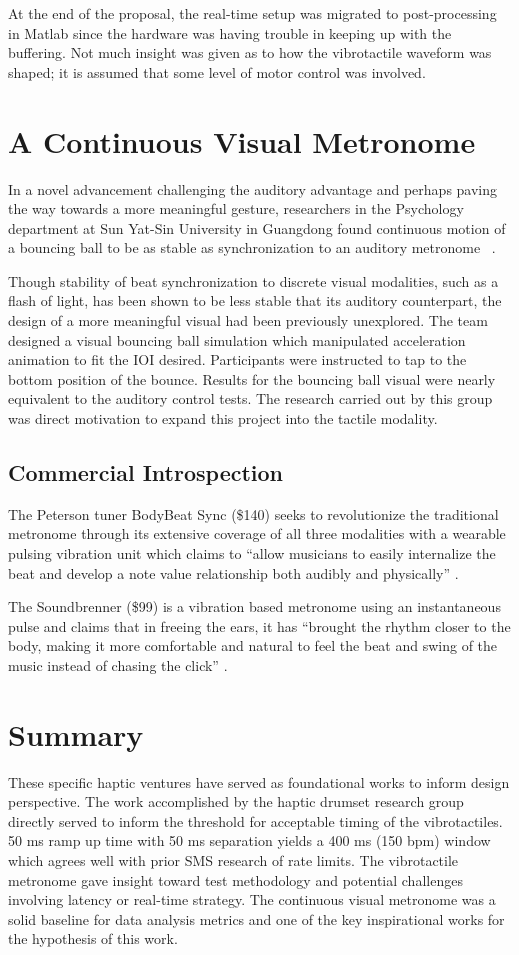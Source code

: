 At the end of the proposal, the real-time setup was migrated to post-processing in Matlab since the hardware was having trouble in keeping up with the buffering. Not much insight was given as to how the vibrotactile waveform was shaped; it is assumed that some level of motor control was involved.

\section{A Continuous Visual Metronome} \label{visualMet}
In a novel advancement challenging the auditory advantage and perhaps paving the way towards a more meaningful gesture, researchers in the Psychology department at Sun Yat-Sin University in Guangdong found continuous motion of a bouncing ball to be as stable as synchronization to an auditory metronome
~\cite{gan2015synchronization}.

Though stability of beat synchronization to discrete visual modalities, such as a flash of light, has been shown to be less stable that its auditory counterpart, the design of a more meaningful visual had been previously unexplored. The team designed a visual bouncing ball simulation which manipulated acceleration animation to fit the IOI desired. Participants were instructed to tap to the bottom position of the bounce. Results for the bouncing ball visual were nearly equivalent to the auditory control tests. The research carried out by this group was direct motivation to expand this project into the tactile modality.

\subsection{Commercial Introspection} \label{commercial}
The Peterson tuner BodyBeat Sync (\$140) seeks to revolutionize the traditional metronome through its extensive coverage of all three modalities with a wearable pulsing vibration unit which claims to “allow musicians to easily internalize the beat and develop a note value relationship both audibly and physically” \cite{Peterson}.

The Soundbrenner (\$99) is a vibration based metronome using an instantaneous pulse and claims that in freeing the ears, it has “brought the rhythm closer to the body, making it more comfortable and natural to feel the beat and swing of the music instead of chasing the click” \cite{Soundbrenner}.

\section{Summary}
These specific haptic ventures have served as foundational works to inform design perspective. The work accomplished by the haptic drumset research group directly served to inform the threshold for acceptable timing of the vibrotactiles. 50 ms ramp up time with 50 ms separation yields a 400 ms (150 bpm) window which agrees well with prior SMS research of rate limits. The vibrotactile metronome gave insight toward test methodology and potential challenges involving latency or real-time strategy. The continuous visual metronome was a solid baseline for data analysis metrics and one of the key inspirational works for the hypothesis of this work.